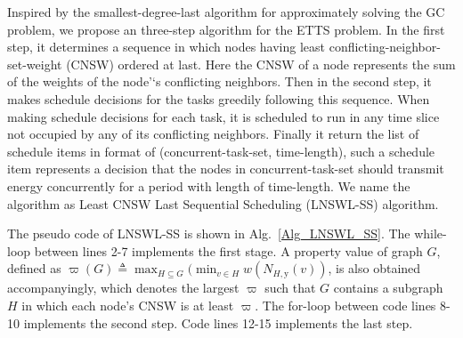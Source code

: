 \documentclass[journal,10pt]{IEEEtran}
\begin{document}
Inspired by the smallest-degree-last algorithm for approximately solving the GC problem, we propose an three-step algorithm for the ETTS problem. In the first step, it determines a sequence in which nodes having least conflicting-neighbor-set-weight (CNSW) ordered at last. Here the CNSW of a node represents the sum of the weights of the node'`s conflicting neighbors. Then in the second step, it makes schedule decisions for the tasks greedily following this sequence. When making schedule decisions for each task, it is scheduled to run in any time slice not occupied by any of its conflicting neighbors. Finally it return the list of schedule items in format of (concurrent-task-set, time-length), such a schedule item represents a decision that the nodes in concurrent-task-set should transmit energy concurrently for a period with length of time-length. We name the algorithm as Least CNSW Last Sequential Scheduling (LNSWL-SS) algorithm.

The pseudo code of LNSWL-SS is shown in Alg.~\ref{Alg_LNSWL_SS}. The while-loop between lines 2-7 implements the first stage. A property value of graph $G$, defined as $\varpi(G){\triangleq}\max_{H{\subseteq}G}(\min_{v{\in}H}w(N_{H,\text{y}}(v))$, is also obtained accompanyingly, which denotes the largest $\varpi$ such that $G$ contains a subgraph $H$ in which each node's CNSW is at least $\varpi$. The for-loop between code lines 8-10 implements the second step. Code lines 12-15 implements the last step.
\end{document}
